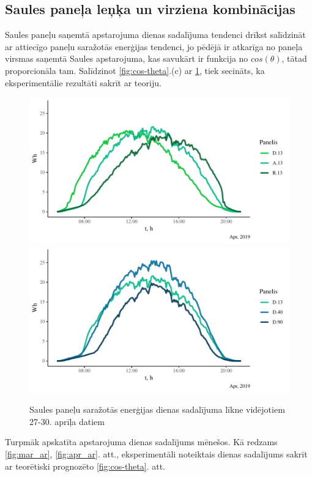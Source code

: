 \subsection{Saules paneļa leņķa un virziena kombinācijas}
\label{subsection:month_day}

Saules paneļu saņemtā apstarojuma dienas sadalījuma tendenci drīkst salīdzināt ar attiecīgo paneļu saražotās enerģijas tendenci, jo pēdējā ir atkarīga no paneļa virsmas saņemtā Saules apstarojuma, kas savukārt ir funkcija no $cos(\theta)$, tātad proporcionāla tam. Salīdzinot \ref{fig:cos-theta}.(c) ar 
\ref{fig:toldU}, tiek secināts, ka eksperimentālie rezultāti sakrīt ar teoriju.

\begin{figure}[h]
    \centering
    \includegraphics[width=\linewidth]{figures/sol_day/apr_LG_13.pdf}
    \includegraphics[width=\linewidth]{figures/sol_day/apr_LG_D.pdf}
    \caption{Saules paneļu saražotās enerģijas dienas sadalījuma līkne vidējotiem 27-30. aprīļa datiem} \label{fig:toldU}
\end{figure}

Turpmāk apskatīta apstarojuma dienas sadalījums mēnešos. Kā redzams \ref{fig:mar_ar}, \ref{fig:apr_ar}. att., eksperimentāli noteiktais dienas sadalījums sakrīt ar teorētiski prognozēto \ref{fig:cos-theta}. att.

